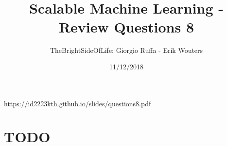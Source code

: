 \documentclass[a4paper]{article}
\title{Scalable Machine Learning - Review Questions 8}
\author{TheBrightSideOfLife: Giorgio Ruffa - Erik Wouters}
\date{11/12/2018}
\begin{document}
\maketitle

\url{https://id2223kth.github.io/slides/questions8.pdf}

\section{TODO}


{}

\end{document}
